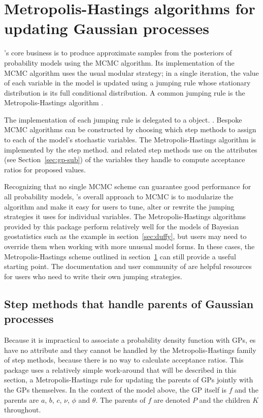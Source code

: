 \documentclass[article]{jss}
\begin{document}
\section{Metropolis-Hastings algorithms for updating Gaussian processes}
\label{sec:step-methods}

's core business is to produce approximate samples from the posteriors of probability models using the MCMC algorithm. Its implementation of the MCMC algorithm uses the usual modular strategy; in a single iteration, the value of each variable in the model is updated using a jumping rule whose stationary distribution is its full conditional distribution. A common jumping rule is the Metropolis-Hastings algorithm \citep{gamerman}. 

The implementation of each jumping rule is delegated to a  object. \citep{pymc}. Bespoke MCMC algorithms can be constructed by choosing which step methods to assign to each of the model's stochastic variables. The Metropolis-Hastings algorithm is implemented by the  step method.  and related step methods use on the  attributes (see Section~\ref{sec:gp-sub}) of the variables they handle to compute acceptance ratios for proposed values. 

Recognizing that no single MCMC scheme can guarantee good performance for all probability models, 's overall approach to MCMC is to modularize the algorithm and make it easy for users to tune, alter or rewrite the jumping strategies it uses for individual variables. The Metropolis-Hastings algorithms provided by this package perform relatively well for the models of Bayesian geostatistics such as the example in section~\ref{sec:duffy}, but users may need to override them when working with more unusual model forms. In these cases, the Metropolis-Hastings scheme outlined in section~\ref{sec:step-methods} can still provide a useful starting point. The documentation and user community of  are helpful resources for users who need to write their own jumping strategies. 



\subsection{Step methods that handle parents of Gaussian processes}
Because it is impractical to associate a probability density function with GPs, es have no  attribute and they cannot be handled by the Metropolis-Hastings family of step methods, because there is no way to calculate acceptance ratios. This package uses a relatively simple work-around that will be described in this section, a Metropolis-Hastings rule for updating the parents of GPs jointly with the GPs themselves. In the context of the model above, the GP itself is $f$ and the parents are $a$, $b$, $c$, $\nu$, $\phi$ and $\theta$. The parents of $f$ are denoted $P$ and the children $K$ throughout.
\end{document}
